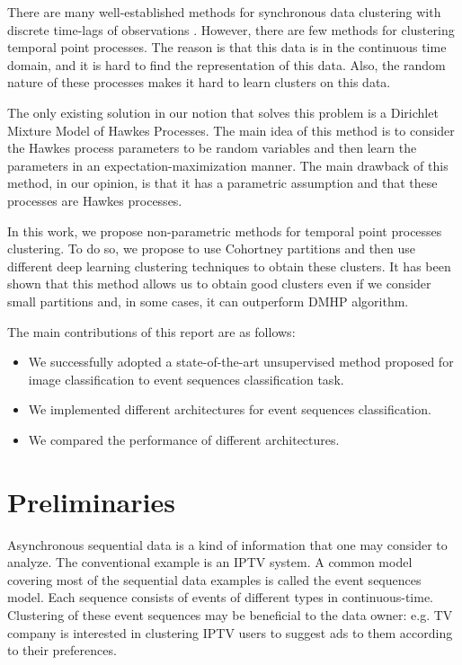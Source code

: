 \documentclass[10pt]{article}
\begin{document}
There are many well-established methods for synchronous data clustering with discrete time-lags of observations \cite{surv_ts_clus}. However, there are few methods for clustering temporal point processes. The reason is that this data is in the continuous time domain, and it is hard to find the representation of this data. Also, the random nature of these processes makes it hard to learn clusters on this data. 

The only existing solution in our notion that solves this problem is a Dirichlet Mixture Model of Hawkes Processes\cite{123dirichlet}. The main idea of this method is to consider the Hawkes process parameters to be random variables and then learn the parameters in an expectation-maximization manner. The main drawback of this method, in our opinion, is that it has a parametric assumption and that these processes are Hawkes processes. 

In this work, we propose non-parametric methods for temporal point processes clustering. To do so, we propose to use Cohortney partitions and then use different deep learning clustering techniques to obtain these clusters. It has been shown that this method allows us to obtain good clusters even if we consider small partitions and, in some cases, it can outperform DMHP algorithm.

The main contributions of this report are as
follows:

\begin{itemize}
    \setlength{\parskip}{0pt}
    \item We successfully adopted a state-of-the-art unsupervised method proposed for image classification to event sequences classification task. 
    \item We implemented different architectures for event sequences classification.
    \item We compared the performance of different architectures.
\end{itemize}

\section{Preliminaries}\label{sec:prelim}

Asynchronous sequential data is a kind of information that one may consider to analyze. The conventional example is an IPTV system. A common model covering most of the sequential data examples is called the event sequences model. Each sequence consists of events of different types in continuous-time. Clustering of these event sequences may be beneficial to the data owner: e.g. TV company is interested in clustering IPTV users to suggest ads to them according to their preferences.  
\end{document}
